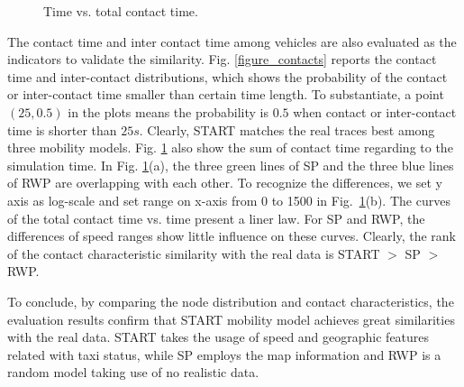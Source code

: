 \begin{figure}[!t]
\centering
{}
\caption{Time vs. total contact time.}\label{figure_total_contact_time}
\end{figure}


The contact time and inter contact time among vehicles are also evaluated as the indicators to validate the similarity.
Fig. \ref{figure_contacts} reports the contact time and inter-contact distributions, which shows the probability of the contact or inter-contact time smaller than certain time length. To substantiate, a point $(25,0.5)$ in the plots means the probability is $0.5$ when contact or inter-contact time is shorter than $25s$. Clearly, START matches the real traces best among three mobility models.
Fig. \ref{figure_total_contact_time} also show the sum of contact time regarding to the simulation time.
In Fig. \ref{figure_total_contact_time}(a), the three green lines of SP and the three blue lines of RWP are overlapping with each other.
To recognize the differences, we set y axis as log-scale and set range on x-axis from 0 to 1500 in Fig.~\ref{figure_total_contact_time}(b). The curves of the total contact time vs. time present a liner law. For SP and RWP, the differences of speed ranges show little influence on these curves.
Clearly, the rank of the contact characteristic similarity with the real data is START $>$ SP $>$ RWP.

To conclude, by comparing the node distribution and contact characteristics, the evaluation results confirm that START mobility model achieves great similarities with the real data. START takes the usage of speed and geographic features related with taxi status, while SP employs the map information and RWP is a random model taking use of no realistic data.


